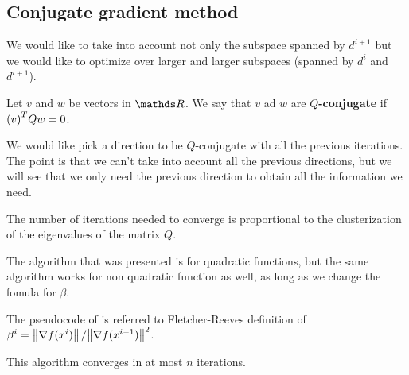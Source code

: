 \documentclass[computational_mathematics.tex]{subfiles}
\begin{document}
\subsection{Conjugate gradient method}



We would like to take into account not only the subspace spanned by $d^{i+1}$ but we would like to optimize over larger and larger subspaces (spanned by $d^i$ and $d^{i+1}$).

\begin{definition}[Q-conjugate]
Let $v$ and $w$ be vectors in $\R$. We say that $v$ ad $w$ are \textbf{$Q$-conjugate} if ${(v)}^{T} Q w = 0$.
\end{definition}

We would like pick a direction to be $Q$-conjugate with all the previous iterations. The point is that we can't take into account all the previous directions, but we will see that we only need the previous direction to obtain all the information we need.


The number of iterations needed to converge is proportional to the clusterization of the eigenvalues of the matrix $Q$.

The algorithm that was presented is for quadratic functions, but the same algorithm works for non quadratic function as well, as long as we change the fomula for $\beta$.

The pseudocode of  is referred to Fletcher-Reeves definition of $\beta^i = \left\lVert\nabla f(x^i)\right\rVert / {\left\lVert\nabla f(x^{i-1})\right\rVert}^2$.

This algorithm converges in at most $n$ iterations.
\end{document}

